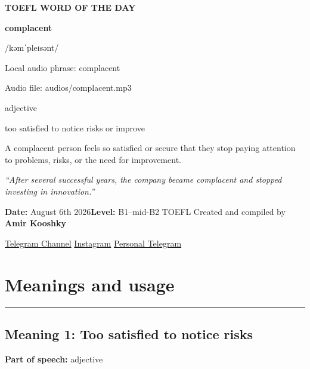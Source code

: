 \documentclass[11pt]{article}
\newcommand{\sectionrule}{\par\vspace{-0.5em}\noindent\textcolor{Accent}{\rule{\linewidth}{0.6pt}}\par}
\begin{document}
\begin{center}
{\sffamily\bfseries\color{Accent} TOEFL WORD OF THE DAY\par}
\vspace{8mm}
{\fontsize{42}{48}\selectfont\bfseries complacent\par}
\vspace{2mm}
{\Large\sffamily\color{Accent} /kəmˈpleɪsənt/\par}
\vspace{2mm}
{\small\sffamily Local audio phrase: complacent\par}
{\small\sffamily Audio file: audios/complacent.mp3\par}
\vspace{2mm}
{\large\sffamily\color{Muted} adjective\par}
\vspace{5mm}
{\sffamily too satisfied to notice risks or improve\par}
\vspace{6mm}
{\large A complacent person feels so satisfied or secure that they stop paying attention to problems, risks, or the need for improvement.\par}
\vspace{6mm}
\begin{minipage}{0.84\textwidth}
\itshape “After several successful years, the company became complacent and stopped investing in innovation.”
\end{minipage}\par
\vspace{10mm}
\textbf{Date:} August 6th 2026\quad\textbullet\quad \textbf{Level:} B1--mid-B2 TOEFL
\vfill
Created and compiled by \textbf{Amir Kooshky}\par
\vspace{2mm}
\href{https://t.me/KooshkyTOEFL}{Telegram Channel}\quad\textbullet\quad
\href{https://www.instagram.com/kooshkytoefl}{Instagram}\quad\textbullet\quad
\href{https://t.me/KooshkyTOEFL\_pv}{Personal Telegram}
\end{center}
\newpage
\tableofcontents
\newpage

\section{Meanings and usage}
\sectionrule
\subsection{Meaning 1: Too satisfied to notice risks}
\textbf{Part of speech:} adjective
\end{document}
